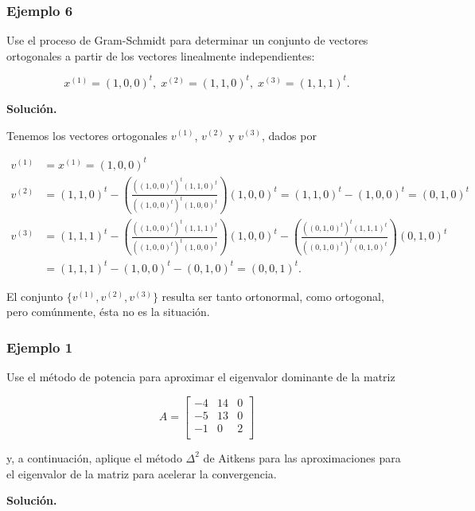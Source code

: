 \documentclass{report}
\numberwithin{subsection}{section} %
\begin{document}
\subsubsection*{Ejemplo 6}
        
Use el proceso de Gram-Schmidt para determinar un conjunto de vectores ortogonales a partir de los vectores linealmente independientes:

$$x^{(1)} = (1, 0, 0)^t, \; x^{(2)} = (1, 1, 0)^t, \; x^{(3)} = (1, 1, 1)^t.$$

{\bf Solución.}

Tenemos los vectores ortogonales $v^{(1)}$, $v^{(2)}$ y $v^{(3)}$, dados por

\begin{align*}
    v^{(1)} &= x^{(1)} = (1, 0, 0)^t \\
    v^{(2)} &= (1, 1, 0)^t - \left(\frac{((1, 0, 0)^t)^t (1, 1, 0)^t}{((1, 0, 0)^t)^t (1, 0, 0)^t}\right) (1, 0, 0)^t = (1, 1, 0)^t - (1, 0, 0)^t = (0, 1, 0)^t \\
    v^{(3)} &= (1, 1, 1)^t - \left(\frac{((1, 0, 0)^t)^t (1, 1, 1)^t}{((1, 0, 0)^t)^t (1, 0, 0)^t}\right)(1, 0, 0)^t - \left(\frac{((0, 1, 0)^t)^t (1, 1, 1)^t}{((0, 1, 0)^t)^t (0, 1, 0)^t}\right)(0, 1, 0)^t \\
    &= (1, 1, 1)^t - (1, 0, 0)^t - (0, 1, 0)^t = (0, 0, 1)^t.
\end{align*}

El conjunto $\{v^{(1)}, v^{(2)}, v^{(3)}\}$ resulta ser tanto ortonormal, como ortogonal, pero comúnmente, ésta no es la situación.




\subsubsection*{Ejemplo 1} %
        
    Use el método de potencia para aproximar el eigenvalor dominante de la matriz

    $$A =\begin{bmatrix}
        -4 & 14 & 0 \\
        -5 & 13 & 0 \\
        -1 & 0 & 2 \\
    \end{bmatrix}$$

    y, a continuación, aplique el método $\Delta^2$ de Aitkens para las aproximaciones para el eigenvalor de la matriz para acelerar la convergencia.

    {\bf Solución.}
\end{document}
